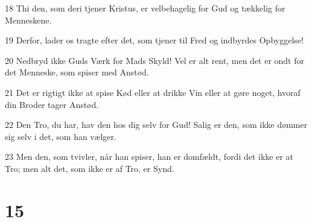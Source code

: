 \par 18 Thi den, som deri tjener Kristus, er velbehagelig for Gud og tækkelig for Menneskene.
\par 19 Derfor, lader os tragte efter det, som tjener til Fred og indbyrdes Opbyggelse!
\par 20 Nedbryd ikke Guds Værk for Mads Skyld! Vel er alt rent, men det er ondt for det Menneske, som spiser med Anstød.
\par 21 Det er rigtigt ikke at spise Kød eller at drikke Vin eller at gøre noget, hvoraf din Broder tager Anstød.
\par 22 Den Tro, du har, hav den hos dig selv for Gud! Salig er den, som ikke dømmer sig selv i det, som han vælger.
\par 23 Men den, som tvivler, når han spiser, han er domfældt, fordi det ikke er at Tro; men alt det, som ikke er af Tro, er Synd.

\chapter{15}

